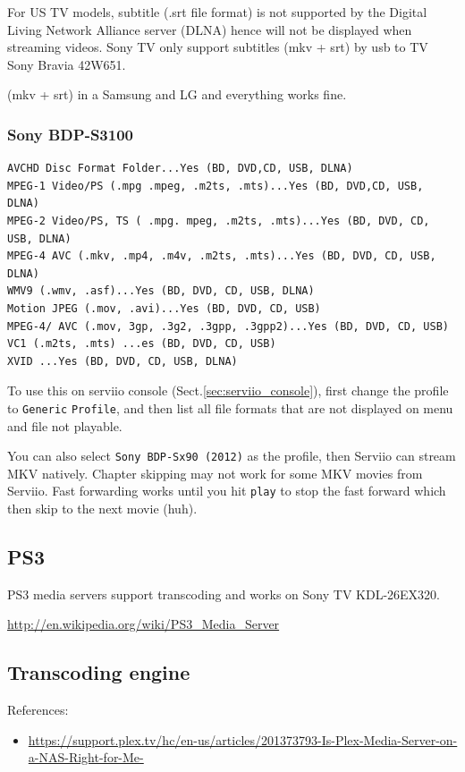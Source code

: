 For US TV models, subtitle (.srt file format) is not supported by the Digital
Living Network Alliance server (DLNA) hence will not be displayed when streaming videos.
Sony TV only support subtitles (mkv + srt) by usb to TV
Sony Bravia 42W651.

 (mkv + srt) in a Samsung and LG and everything works fine. 


\subsubsection{Sony BDP-S3100}

\begin{verbatim}
AVCHD Disc Format Folder...Yes (BD, DVD,CD, USB, DLNA)
MPEG-1 Video/PS (.mpg .mpeg, .m2ts, .mts)...Yes (BD, DVD,CD, USB, DLNA)
MPEG-2 Video/PS, TS ( .mpg. mpeg, .m2ts, .mts)...Yes (BD, DVD, CD, USB, DLNA)
MPEG-4 AVC (.mkv, .mp4, .m4v, .m2ts, .mts)...Yes (BD, DVD, CD, USB, DLNA)
WMV9 (.wmv, .asf)...Yes (BD, DVD, CD, USB, DLNA)
Motion JPEG (.mov, .avi)...Yes (BD, DVD, CD, USB)
MPEG-4/ AVC (.mov, 3gp, .3g2, .3gpp, .3gpp2)...Yes (BD, DVD, CD, USB)
VC1 (.m2ts, .mts) ...es (BD, DVD, CD, USB)
XVID ...Yes (BD, DVD, CD, USB, DLNA)
\end{verbatim}

To use this on serviio console (Sect.\ref{sec:serviio_console}), first change
the profile to \verb!Generic! \verb!Profile!, and then list all file formats
that are not displayed on menu and file not playable.

You can also select \verb!Sony BDP-Sx90 (2012)! as the profile, then Serviio can
stream MKV natively. Chapter skipping may not work for some MKV movies from
Serviio. Fast forwarding works until you hit \verb!play! to stop the fast
forward which then skip to the next movie (huh).
\subsection{PS3}

PS3 media servers support transcoding and works on Sony TV  KDL-26EX320.

\url{http://en.wikipedia.org/wiki/PS3_Media_Server}

\subsection{Transcoding engine}

References:
\begin{itemize}
  \item
  \url{https://support.plex.tv/hc/en-us/articles/201373793-Is-Plex-Media-Server-on-a-NAS-Right-for-Me-}
\end{itemize}


